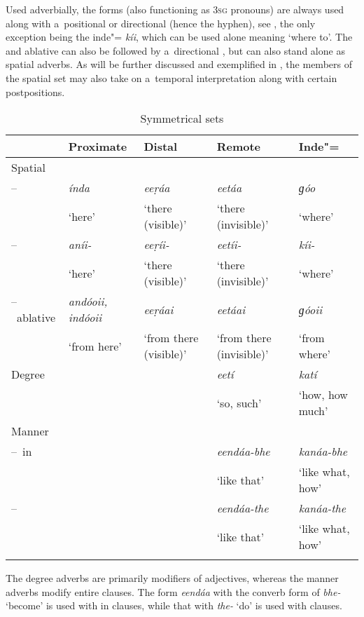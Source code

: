 Used adverbially, the  forms (also functioning as \textsc{3sg}  pronouns) are always used
along with a~positional or directional  (hence the hyphen), see , the only
exception being the inde"= \textit{kíi}, which can be used alone meaning
`where to'. The  and ablative can also be followed by a~directional , but can
also stand alone as spatial adverbs. As will be further discussed and exemplified in , the
members of the spatial set may also take on a~temporal interpretation along with certain
postpositions.


\begin{table}[ht]
\caption{Symmetrical  sets}
\begin{tabularx}{\textwidth}{ l Q Q Q Q }
\lsptoprule
&
Proximate &
Distal &
Remote &
Inde"=\\\hline
Spatial &
&
&
&
\\
--~ &
\textit{índa} &
\textit{eeṛáa} &
\textit{eetáa} &
\textit{ɡóo} \\
&
`here' &
`there (visible)' &
`there (invisible)' &
`where'\\
--~ &
\textit{aníi-} &
\textit{eeṛíi-} &
\textit{eetíi-} &
\textit{kíi-} \\
&
`here' &
`there (visible)' &
`there (invisible)' &
`where'\\
--~ablative &
\textit{andóoii, indóoii} &
\textit{eeṛáai} &
\textit{eetáai} &
\textit{ɡóoii} \\
&
`from here' &
`from there (visible)' &
`from there (invisible)' &
`from where'\\
Degree &
&
&
\textit{eetí} &
\textit{katí} \\
&
&
&
`so, such' &
`how, how much'\\
Manner &
&
&
&
\\
--~in &
&
&
\textit{eendáa-bhe} &
\textit{kanáa-bhe} \\
&
&
&
`like that' &
`like what, how'\\
--~ &
&
&
\textit{eendáa-the} &
\textit{kanáa-the} \\
&
&
&
`like that' &
`like what, how'\\\lspbottomrule
\end{tabularx}
\label{tab:7-1}
\end{table}

The degree adverbs are primarily modifiers of adjectives, whereas the manner adverbs modify entire clauses. The form \textit{eendáa} with the converb form of \textit{bhe-} `become' is used with in clauses, while that with \textit{the-} `do' is used with  clauses. 

